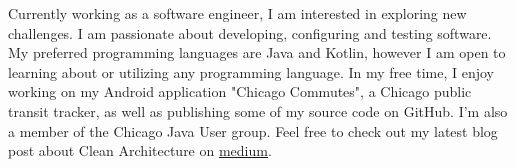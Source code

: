 
\begin{cvsynopsis}

\cvparagraph
Currently working as a software engineer, I am interested in exploring new challenges. I am passionate about developing, configuring and testing software. My preferred programming languages are Java and Kotlin, however I am open to learning about or utilizing any programming language. In my free time, I enjoy working on my Android application "Chicago Commutes", a Chicago public transit tracker, as well as publishing some of my source code on GitHub. I'm also a member of the Chicago Java User group. Feel free to check out my latest blog post about Clean Architecture on \href{https://medium.com/slalom-engineering/clean-architecture-with-java-11-f78bba431041}{\underline{medium}}.


\end{cvsynopsis}
